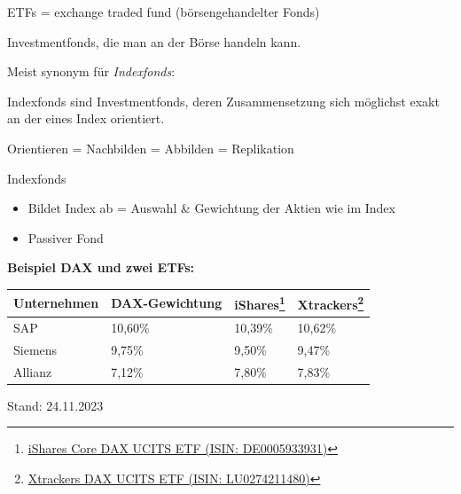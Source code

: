 \documentclass{beamer}
\begin{document}
			\begin{frame}
				ETFs = exchange traded fund (börsengehandelter Fonds)
				\begin{definition}
					Investmentfonds, die man an der Börse handeln kann.
				\end{definition}
				Meist synonym für \textit{Indexfonds}:\pause
				\begin{definition}
					Indexfonds sind Investmentfonds, deren Zusammensetzung sich möglichst exakt an der eines Index orientiert.\citewiki{Indexfonds}
				\end{definition}
				Orientieren = Nachbilden = Abbilden = Replikation
			\end{frame}
		
			\begin{frame}{Indexfonds}
				\begin{itemize}
					\item Bildet Index ab = Auswahl \& Gewichtung der Aktien wie im Index
					\item Passiver Fond
				\end{itemize}
				\pause
				\vspace{0.25cm}
				\textbf{Beispiel DAX und zwei ETFs:}
				\vspace{0.25cm}
				\begin{tabularx}{\linewidth}{X|p{3cm}|X|X}
					Unternehmen & DAX-Gewichtung & iShares\footnote{\href{https://de.extraetf.com/etf-profile/DE0005933931?tab=components}{iShares Core DAX UCITS ETF (ISIN: DE0005933931)}} & Xtrackers\footnote{\href{https://de.extraetf.com/etf-profile/LU0274211480?tab=components}{Xtrackers DAX UCITS ETF (ISIN: LU0274211480)}}\\
					\hline
					SAP		& 10,60\%	& 10,39\%	& 10,62\% \\
					Siemens	&  9,75\%	&  9,50\%	&  9,47\% \\
					Allianz	&  7,12\%	&  7,80\%	&  7,83\%
				\end{tabularx}
				{\tiny Stand: 24.11.2023}
			\end{frame}
		
\end{document}
